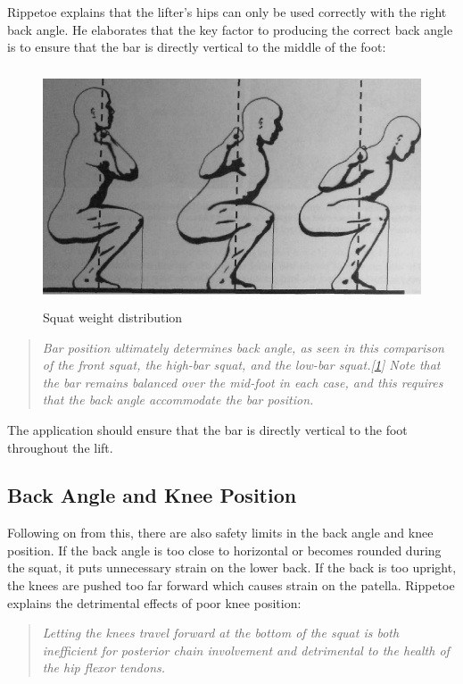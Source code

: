Rippetoe explains that the lifter's hips can only be used correctly with the right back angle. He elaborates that the key factor to producing the correct back angle is to ensure that the bar is directly vertical to the middle of the foot:

\begin{figure}[H]
    \centering
	\includegraphics[height=7cm]{squat/images/rippetoe_weight_distro}
\caption{Squat weight distribution}
\label{fig:rippetoe_weight}
\end{figure}

\begin{quote}
\emph{Bar position ultimately determines back angle, as seen in this comparison of the front squat, the high-bar squat, and the low-bar squat.[\ref{fig:rippetoe_weight}] Note that the bar remains balanced over the mid-foot in each case, and this requires that the back angle accommodate the bar position.}
\end{quote}

The application should ensure that the bar is directly vertical to the foot throughout the lift.

\subsection{Back Angle and Knee Position}

Following on from this, there are also safety limits in the back angle and knee position. If the back angle is too close to horizontal or becomes rounded during the squat, it puts unnecessary strain on the lower back. If the back is too upright, the knees are pushed too far forward which causes strain on the patella. Rippetoe explains the detrimental effects of poor knee position:

\begin{quote}
\emph{Letting the knees travel forward at the bottom of the squat is both inefficient for posterior chain involvement and detrimental to the health of the hip flexor tendons.}
\end{quote}

